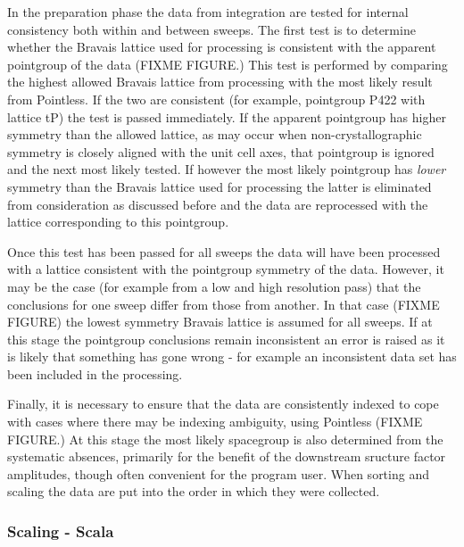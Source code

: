 \documentclass[preprint,pdf]{iucr}
\begin{document}
In the preparation phase the data from integration are tested for
internal consistency both within and between sweeps. The first test is
to determine whether the Bravais lattice used for processing is
consistent with the apparent pointgroup of the data (FIXME FIGURE.)
This test is performed by comparing the highest allowed Bravais
lattice from processing with the most likely result from Pointless. If
the two are consistent (for example, pointgroup P422 with lattice tP)
the test is passed immediately. If the apparent pointgroup has higher
symmetry than the allowed lattice, as may occur when
non-crystallographic symmetry is closely aligned with the unit cell
axes, that pointgroup is ignored and the next most likely tested. If
however the most likely pointgroup has \emph{lower} symmetry than the
Bravais lattice used for processing the latter is eliminated from
consideration as discussed before and the data are reprocessed with
the lattice corresponding to this pointgroup.

Once this test has been passed for all sweeps the data will have been
processed with a lattice consistent with the pointgroup symmetry of
the data. However, it may be the case (for example from a low and high
resolution pass) that the conclusions for one sweep differ from those
from another. In that case (FIXME FIGURE) the lowest symmetry Bravais
lattice is assumed for all sweeps. If at this stage the pointgroup
conclusions remain inconsistent an error is raised as it is likely
that something has gone wrong - for example an inconsistent data set
has been included in the processing. 

Finally, it is necessary to ensure that the data are consistently
indexed to cope with cases where there may be indexing ambiguity,
using Pointless (FIXME FIGURE.) At this stage the most likely
spacegroup is also determined from the systematic absences, primarily
for the benefit of the downstream sructure factor amplitudes, though
often convenient for the program user. When sorting and scaling the
data are put into the order in which they were collected.

\subsubsection{Scaling - Scala}
\end{document}
